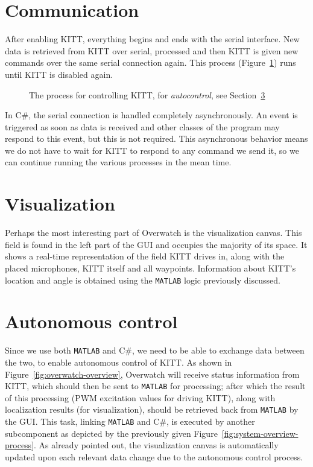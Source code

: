 \documentclass[11pt,titlepage]{report}
\begin{document}
\section{Communication}
After enabling KITT, everything begins and ends with the serial interface. New data is retrieved from KITT over serial, processed and then KITT is given new commands over the same serial connection again. This process (Figure~\ref{fig:overwatch-process}) runs until KITT is disabled again.

\begin{figure}[H]
	\centering
	
	\caption{The process for controlling KITT, for \emph{autocontrol}, see Section~\ref{sec:gui-autocontrol}}
	\label{fig:overwatch-process}
\end{figure}

In C\#, the serial connection is handled completely asynchronously. An event is triggered as soon as data is received and other classes of the program may respond to this event, but this is not required. This asynchronous behavior means we do not have to wait for KITT to respond to any command we send it, so we can continue running the various processes in the mean time.

\section{Visualization}
Perhaps the most interesting part of Overwatch is the visualization canvas. This field is found in the left part of the GUI and occupies the majority of its space. It shows a real-time representation of the field KITT drives in, along with the placed microphones, KITT itself and all waypoints. Information about KITT's location and angle is obtained using the \texttt{MATLAB} logic previously discussed.

\section{Autonomous control}
\label{sec:gui-autocontrol}
Since we use both \texttt{MATLAB} and C\#, we need to be able to exchange data between the two, to enable autonomous control of KITT. As shown in Figure~\ref{fig:overwatch-overview}, Overwatch will receive status information from KITT, which should then be sent to \texttt{MATLAB} for processing; after which the result of this processing (PWM excitation values for driving KITT), along with localization results (for visualization), should be retrieved back from \texttt{MATLAB} by the GUI. This task, linking \texttt{MATLAB} and C\#, is executed by another subcomponent as depicted by the previously given Figure~\ref{fig:system-overview-process}. As already pointed out, the visualization canvas is automatically updated upon each relevant data change due to the autonomous control process.
\end{document}
